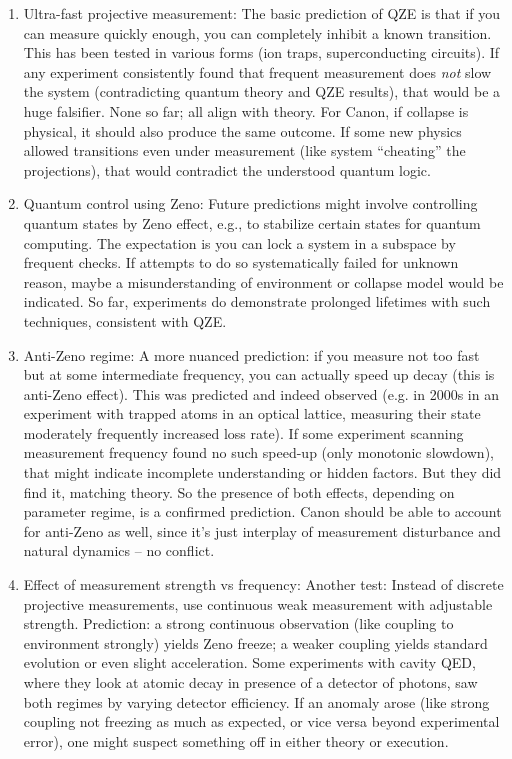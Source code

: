 \documentclass[11pt]{article}
\begin{document}
\begin{enumerate}

\item 
Ultra-fast projective measurement: The basic prediction of QZE is that if you can measure quickly enough, you can completely inhibit a known transition. This has been tested in various forms (ion traps, superconducting circuits). If any experiment consistently found that frequent measurement does \textit{not} slow the system (contradicting quantum theory and QZE results), that would be a huge falsifier. None so far; all align with theory. For Canon, if collapse is physical, it should also produce the same outcome. If some new physics allowed transitions even under measurement (like system “cheating” the projections), that would contradict the understood quantum logic.




\item 
Quantum control using Zeno: Future predictions might involve controlling quantum states by Zeno effect, e.g., to stabilize certain states for quantum computing. The expectation is you can lock a system in a subspace by frequent checks. If attempts to do so systematically failed for unknown reason, maybe a misunderstanding of environment or collapse model would be indicated. So far, experiments do demonstrate prolonged lifetimes with such techniques, consistent with QZE.




\item 
Anti-Zeno regime: A more nuanced prediction: if you measure not too fast but at some intermediate frequency, you can actually speed up decay (this is anti-Zeno effect). This was predicted and indeed observed (e.g. in 2000s in an experiment with trapped atoms in an optical lattice, measuring their state moderately frequently increased loss rate). If some experiment scanning measurement frequency found no such speed-up (only monotonic slowdown), that might indicate incomplete understanding or hidden factors. But they did find it, matching theory. So the presence of both effects, depending on parameter regime, is a confirmed prediction. Canon should be able to account for anti-Zeno as well, since it's just interplay of measurement disturbance and natural dynamics – no conflict.




\item 
Effect of measurement strength vs frequency: Another test: Instead of discrete projective measurements, use continuous weak measurement with adjustable strength. Prediction: a strong continuous observation (like coupling to environment strongly) yields Zeno freeze; a weaker coupling yields standard evolution or even slight acceleration. Some experiments with cavity QED, where they look at atomic decay in presence of a detector of photons, saw both regimes by varying detector efficiency. If an anomaly arose (like strong coupling not freezing as much as expected, or vice versa beyond experimental error), one might suspect something off in either theory or execution.


\end{enumerate}
\end{document}
